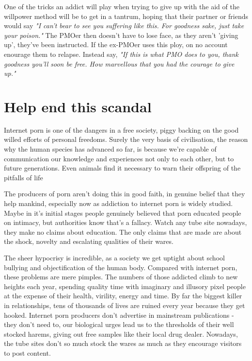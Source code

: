 \documentclass[easypeasy.tex]{subfiles}
\begin{document}
One of the tricks an addict will play when trying to give up with the aid of the willpower method will be to get in a tantrum, hoping that their partner or friends would say \textit{"I can't bear to see you suffering like this. For goodness sake, just take your poison."} The PMOer then doesn't have to lose face, as they aren't 'giving up', they've been instructed. If the ex-PMOer uses this ploy, on no account enourage them to relapse. Instead say, \textit{"If this is what PMO does to you, thank goodness you'll soon be free. How marvellous that you had the courage to give up."}

\section{Help end this scandal}

Internet porn is one of the dangers in a free society, piggy backing on the good willed efforts of personal freedoms. Surely the very basis of civilisation, the reason why the human species has advanced so far, is because we're capable of communication our knowledge and experiences not only to each other, but to future generations. Even animals find it necessary to warn their offspring of the pitfalls of life

The producers of porn aren't doing this in good faith, in genuine belief that they help mankind, especially now as addiction to internet porn is widely studied. Maybe in it's initial stages people genuinely believed that porn educated people on intimacy, but authorities know that's a fallacy. Watch any tube site nowadays, they make no claims about education. The only claims that are made are about the shock, novelty and escalating qualities of their wares.

The sheer hypocrisy is incredible, as a society we get uptight about school bullying and objectification of the human body. Compared with internet porn, these problems are mere pimples. The numbers of those addicted climb to new heights each year, spending quality time with imaginary and illusory pixel people at the expense of their health, virility, energy and time. By far the biggest killer in relationships, tens of thousands of lives are ruined every year because they get hooked. Internet porn producers don't advertise in mainstream publications - they don't need to, our biological urges lead us to the thresholds of their well stocked harems, giving out free samples like their local drug dealer. Nowadays, the tube sites don't so much stock the wares as much as they encourage visitors to post content.
\end{document}
